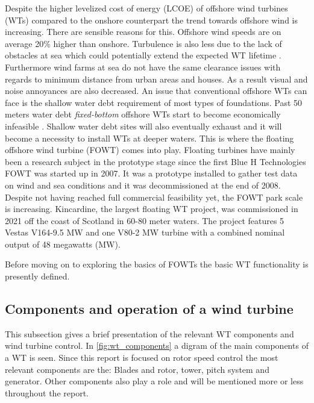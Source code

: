 \smallskip
Despite the higher levelized cost of energy (LCOE) of offshore wind turbines (WTs) compared to the onshore counterpart the trend towards offshore wind is increasing. There are sensible reasons for this. Offshore wind speeds are on average 20\% higher than onshore. Turbulence is also less due to the lack of obstacles at sea which could potentially extend the expected WT lifetime \cite{Christiansen2013}. Furthermore wind farms at sea do not have the same clearance issues with regards to minimum distance from urban areas and houses. As a result visual and noise annoyances are also decreased. An issue that conventional offshore WTs can face is the shallow water debt requirement of most types of foundations. Past 50 meters water debt \textit{fixed-bottom} offshore WTs start to become economically infeasible \cite{Lefebvre2012}. Shallow water debt sites will also eventually exhaust and it will become a necessity to install WTs at deeper waters. This is where the floating offshore wind turbine (FOWT) comes into play. Floating turbines have mainly been a research subject in the prototype stage since the first Blue H Technologies FOWT was started up in 2007. It was a prototype installed to gather test data on wind and sea conditions and it was decommissioned at the end of 2008. Despite not having reached full commercial feasibility yet, the FOWT park scale is increasing. Kincardine, the largest floating WT project, was commissioned in 2021 off the coast of Scotland in 60-80 meter waters. The project features 5 Vestas V164-9.5 MW and one V80-2 MW turbine with a combined nominal output of 48 megawatts (MW).

\smallskip
\noindent Before moving on to exploring the basics of FOWTs the basic WT functionality is presently defined.


\subsection{Components and operation of a wind turbine} \label{sec:intro_wtcomponents}
This subsection gives a brief presentation of the relevant WT components and wind turbine control. In \cref{fig:wt_components} a digram of the main components of a WT is seen. Since this report is focused on rotor speed control the most relevant components are the: Blades and rotor, tower, pitch system and generator. Other components also play a role and will be mentioned more or less throughout the report. 

